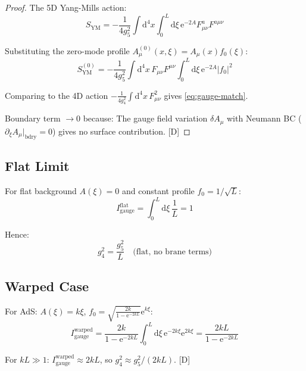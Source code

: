 \documentclass[11pt,a4paper]{article}
\newcommand{\dd}{\mathrm{d}}
\newcommand{\ee}{\mathrm{e}}
\begin{document}
\begin{proof}
The 5D Yang-Mills action:
\begin{equation}
S_{\text{YM}} = -\frac{1}{4g_5^2} \int \dd^4x \int_0^L \dd\xi\, \ee^{-2A} F_{\mu\nu}^a F^{a\mu\nu}
\label{eq:ym-action}
\end{equation}

Substituting the zero-mode profile $A_\mu^{(0)}(x,\xi) = A_\mu(x) f_0(\xi)$:
\begin{equation}
S_{\text{YM}}^{(0)} = -\frac{1}{4g_5^2} \int \dd^4x\, F_{\mu\nu} F^{\mu\nu}
\int_0^L \dd\xi\, \ee^{-2A} |f_0|^2
\label{eq:ym-zero-mode}
\end{equation}

Comparing to the 4D action $-\frac{1}{4g_4^2}\int \dd^4x\, F_{\mu\nu}^2$ gives \eqref{eq:gauge-match}.

Boundary term $\to 0$ because: The gauge field variation $\delta A_\mu$ with Neumann BC
($\partial_\xi A_\mu|_{\text{bdry}} = 0$) gives no surface contribution. [D]
\end{proof}

\subsection{Flat Limit}

For flat background $A(\xi) = 0$ and constant profile $f_0 = 1/\sqrt{L}$:
\begin{equation}
I_{\text{gauge}}^{\text{flat}} = \int_0^L \dd\xi\, \frac{1}{L} = 1
\label{eq:i-gauge-flat}
\end{equation}

Hence:
\begin{equation}
\boxed{
g_4^2 = \frac{g_5^2}{L} \quad \text{(flat, no brane terms)}
}
\label{eq:flat-matching}
\end{equation}

\subsection{Warped Case}

For AdS: $A(\xi) = k\xi$, $f_0 = \sqrt{\frac{2k}{1 - \ee^{-2kL}}}\ee^{k\xi}$:
\begin{equation}
I_{\text{gauge}}^{\text{warped}} = \frac{2k}{1 - \ee^{-2kL}} \int_0^L \dd\xi\, \ee^{-2k\xi} \ee^{2k\xi} = \frac{2kL}{1 - \ee^{-2kL}}
\label{eq:i-gauge-warped}
\end{equation}

For $kL \gg 1$: $I_{\text{gauge}}^{\text{warped}} \approx 2kL$, so $g_4^2 \approx g_5^2/(2kL)$. [D]
\end{document}
